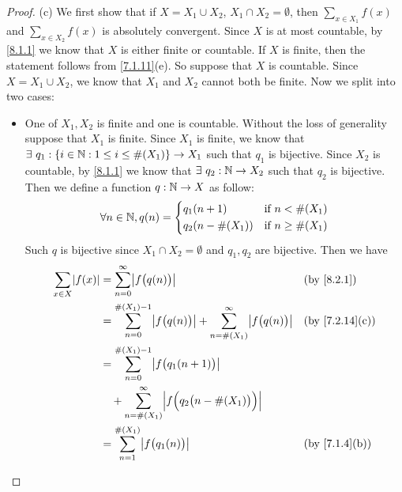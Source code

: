 \begin{proof}{(c)}
  We first show that if \(X = X_1 \cup X_2\), \(X_1 \cap X_2 = \emptyset\), then \(\sum_{x \in X_1} f(x)\) and \(\sum_{x \in X_2} f(x)\) is absolutely convergent.
  Since \(X\) is at most countable, by \cref{8.1.1} we know that \(X\) is either finite or countable.
  If \(X\) is finite, then the statement follows from \cref{7.1.11}(e).
  So suppose that \(X\) is countable.
  Since \(X = X_1 \cup X_2\), we know that \(X_1\) and \(X_2\) cannot both be finite.
  Now we split into two cases:
  \begin{itemize}
    \item One of \(X_1, X_2\) is finite and one is countable.
          Without the loss of generality suppose that \(X_1\) is finite.
          Since \(X_1\) is finite, we know that \(\exists\ q_1 : \{i \in \mathbb{N} : 1 \leq i \leq \#(X_1)\} \to X_1\) such that \(q_1\) is bijective.
          Since \(X_2\) is countable, by \cref{8.1.1} we know that \(\exists\ q_2 : \mathbb{N} \to X_2\) such that \(q_2\) is bijective.
          Then we define a function \(q : \mathbb{N} \to X\) as follow:
          \[
            \forall n \in \mathbb{N}, q(n) = \begin{dcases}
              q_1(n + 1)       & \text{if } n < \#(X_1)    \\
              q_2(n - \#(X_1)) & \text{if } n \geq \#(X_1)
            \end{dcases}
          \]
          Such \(q\) is bijective since \(X_1 \cap X_2 = \emptyset\) and \(q_1, q_2\) are bijective.
          Then we have
          \begin{align*}
            \sum_{x \in X} \abs{f(x)} & = \sum_{n = 0}^\infty \abs{f\big(q(n)\big)}                                                          &  & \text{(by \cref{8.2.1})}     \\
                                      & = \sum_{n = 0}^{\#(X_1) - 1} \abs{f\big(q(n)\big)} + \sum_{n = \#(X_1)}^\infty \abs{f\big(q(n)\big)} &  & \text{(by \cref{7.2.14}(c))} \\
                                      & = \sum_{n = 0}^{\#(X_1) - 1} \abs{f\big(q_1(n + 1)\big)}                                                                               \\
                                      & \quad + \sum_{n = \#(X_1)}^\infty \abs{f\Big(q_2\big(n - \#(X_1)\big)\Big)}                                                            \\
                                      & = \sum_{n = 1}^{\#(X_1)} \abs{f\big(q_1(n)\big)}                                                     &  & \text{(by \cref{7.1.4}(b))}  \\

\end{align*}
\end{itemize}
\end{proof}

